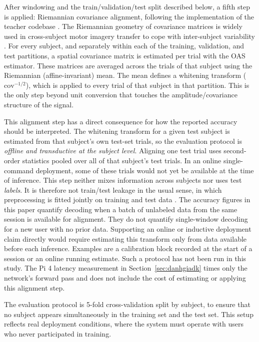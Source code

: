 After windowing and the train/validation/test split described
below, a fifth step is applied: Riemannian covariance alignment,
following the implementation of the teacher codebase
\cite{zoumpourlis2024motor}. The Riemannian geometry of covariance
matrices is widely used in cross-subject motor imagery transfer to
cope with inter-subject variability \cite{xu2021selective}. For every subject, and separately within each of the training,
validation, and test partitions, a spatial covariance matrix is estimated
per trial with the OAS estimator. These matrices are averaged across the
trials of that subject using the Riemannian (affine-invariant) mean. The
mean defines a whitening transform ($\mathrm{cov}^{-1/2}$), which is
applied to every trial of that subject in that partition. This is the only step beyond unit
conversion that touches the amplitude/covariance structure of the
signal.

This alignment step has a direct consequence for how the reported
accuracy should be interpreted. The whitening transform for a given test subject is estimated from that
subject's own test-set trials, so the evaluation protocol is
\emph{offline and transductive at the subject level}. Aligning one test
trial uses second-order statistics pooled over all of that subject's test
trials. In an online single-command deployment, some of these trials would
not yet be available at the time of inference. This step neither mixes
information across subjects nor uses test \emph{labels}. It is therefore
not train/test leakage in the usual sense, in which preprocessing is
fitted jointly on training and test data \cite{kapoor2023leakage}. The
accuracy figures in this paper quantify decoding when a batch of unlabeled
data from the same session is available for alignment. They do not
quantify single-window decoding for a new user with no prior data.
Supporting an online or inductive deployment claim directly would require
estimating this transform only from data available before each inference.
Examples are a calibration block recorded at the start of a session or an
online running estimate. Such a protocol has not been run in this study. The
Pi 4 latency measurement in Section~\ref{sec:danhgiadk} times only
the network's forward pass and does not include the cost of
estimating or applying this alignment step.

The evaluation protocol is 5-fold cross-validation split by subject,
to ensure that no subject appears simultaneously in the training set
and the test set. This setup reflects real deployment conditions,
where the system must operate with users who never participated in
training.


